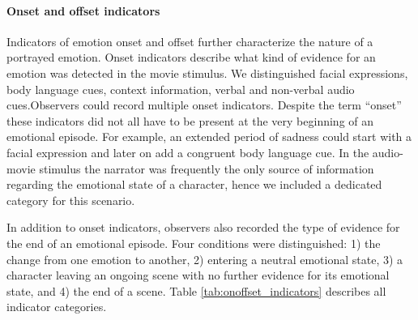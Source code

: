 \paragraph{Onset and offset indicators}

Indicators of emotion onset and offset further characterize the nature of a
portrayed emotion. Onset indicators describe what kind of evidence for an
emotion was detected in the movie stimulus. We distinguished facial
expressions, body language cues, context information, verbal and non-verbal
audio cues.Observers could record multiple onset indicators. Despite the term
``onset'' these indicators did not all have to be present at the very beginning
of an emotional episode. For example, an extended period of sadness could start
with a facial expression and later on add a congruent body language cue.  In
the audio-movie stimulus the narrator was frequently the only source of
information regarding the emotional state of a character, hence we included a
dedicated category for this scenario.

In addition to onset indicators, observers also recorded the type of evidence
for the end of an emotional episode. Four conditions were distinguished: 1) the
change from one emotion to another, 2) entering a neutral emotional state, 3) a
character leaving an ongoing scene with no further evidence for its emotional
state, and 4) the end of a scene.  Table \ref{tab:onoffset_indicators}
describes all indicator categories.

